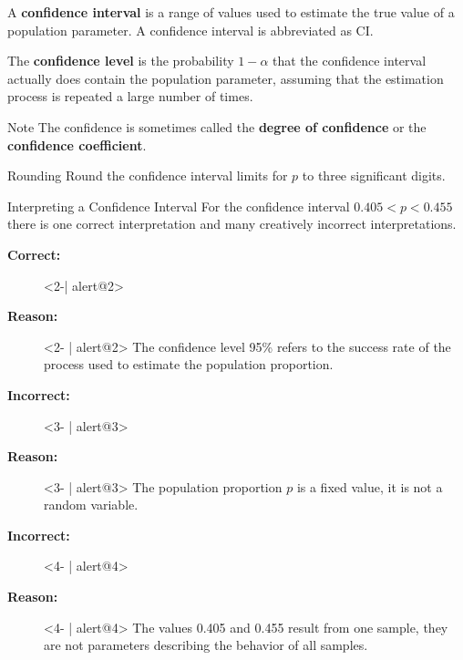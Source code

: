 \documentclass{beamer}
\begin{document}
\begin{frame}
\begin{definition}
A \textbf{confidence interval} is a range of values used to estimate the true value of a population parameter. A confidence interval is abbreviated as CI\@.
\end{definition}\pause

\begin{definition}
The \textbf{confidence level} is the probability $1-\alpha$ that the confidence interval actually does contain the population parameter, assuming that the estimation process is repeated a large number of times.
\end{definition}\pause

\begin{block}{Note}
The confidence is sometimes called the \textbf{degree of confidence} or the \textbf{confidence coefficient}.
\end{block}\pause

\begin{block}{Rounding}
Round the confidence interval limits for $p$ to three significant digits.
\end{block}
\end{frame}

\begin{frame}
\begin{block}{Interpreting a Confidence Interval}
For the confidence interval $0.405<p<0.455$ there is one correct interpretation and many creatively incorrect interpretations.
\begin{description}
\item[\textbf{Correct:}]<2-| alert@2> 
\item[\textbf{Reason:}]<2- | alert@2> The confidence level 95\% refers to the success rate of the process used to estimate the population proportion.
\item[\textbf{Incorrect:}]<3- | alert@3> 
\item[\textbf{Reason:}]<3- | alert@3> The population proportion $p$ is a fixed value, it is not a random variable.
\item[\textbf{Incorrect:}]<4- | alert@4> 
\item[\textbf{Reason:}]<4- | alert@4> The values 0.405 and 0.455 result from one sample, they are not parameters describing the behavior of all samples.
\end{description}
\end{block}
\end{frame}
\end{document}
